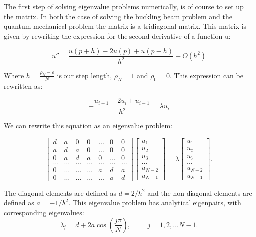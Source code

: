 \documentclass[norsk,a4paper,12pt]{article}
\begin{document}
The first step of solving eigenvalue problems numerically, is of course to set up the matrix. In both the case of solving the buckling beam problem and the quantum mechanical problem the matrix is a tridiagonal matrix. This matrix is given by rewriting the expression for the second derivative of a function u:

$$
u'' = \frac{u(p+h)-2u(p) + u(p-h)}{h^2} + O(h^2)
$$

Where $h=\frac{\rho_N-\rho}{N}$ is our step length, $\rho_N=1$ and $\rho_0=0$. This expression can be rewritten as:

$$
-\frac{u_{i+1}-2u_i+u_{i-1}}{h^2}=\lambda u_i
$$

We can rewrite this equation as an eigenvalue problem:

\begin{equation}
    \begin{bmatrix} d& a & 0   & 0    & \dots  &0     & 0 \\
                                a & d & a & 0    & \dots  &0     &0 \\
                                0   & a & d & a  &0       &\dots & 0\\
                                \dots  & \dots & \dots & \dots  &\dots      &\dots & \dots\\
                                0   & \dots & \dots & \dots  &a  &d & a\\
                                0   & \dots & \dots & \dots  &\dots       &a & d\end{bmatrix} 
                                 \begin{bmatrix} u_1 \\ u_2 \\ u_3 \\ \dots \\ u_{N-2} \\ u_{N-1}\end{bmatrix} = \lambda \begin{bmatrix} u_1 \\ u_2 \\ u_3 \\ \dots \\ u_{N-2} \\ u_{N-1}\end{bmatrix} . 
\label{eq:matrix} 
\end{equation}

The diagonal elements are defined as $d=2/h^2$ and the non-diagonal elements are defined as $a=-1/h^2$. This eigenvalue problem has analytical eigenpairs, with corresponding eigenvalues:
\[
\lambda_j = d+2a\cos{(\frac{j\pi}{N})}, \hspace{1cm} j=1,2,\dots N-1.
\]
\end{document}
